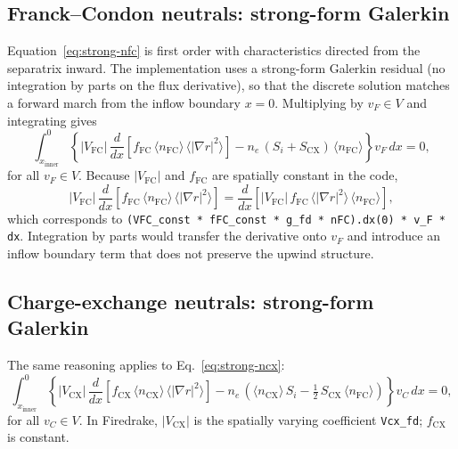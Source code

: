 \subsection{Franck--Condon neutrals: strong-form Galerkin}
\label{sec:nfc-weak}

Equation~\eqref{eq:strong-nfc} is first order with characteristics
directed from the separatrix inward.
The implementation uses a strong-form Galerkin residual (no integration by
parts on the flux derivative), so that the discrete solution matches a
forward march from the inflow boundary $x=0$.
Multiplying by $v_F \in V$ and integrating gives
\begin{equation}
  \int_{x_{\mathrm{inner}}}^{0}
    \left\{
      |V_{\mathrm{FC}}|\,\frac{d}{dx}\!\left[f_{\mathrm{FC}}\,\langle n_{\mathrm{FC}}\rangle\,\langle|\nabla r|^{2}\rangle\right]
      - n_e\,(S_i + S_{\mathrm{CX}})\,\langle n_{\mathrm{FC}}\rangle
    \right\} v_F \, dx = 0,
  \label{eq:weak-nfc}
\end{equation}
for all $v_F \in V$.
Because $|V_{\mathrm{FC}}|$ and $f_{\mathrm{FC}}$ are spatially constant in the code,
\begin{equation}
  |V_{\mathrm{FC}}|\,\frac{d}{dx}\!\left[f_{\mathrm{FC}}\,\langle n_{\mathrm{FC}}\rangle\,\langle|\nabla r|^{2}\rangle\right]
  = \frac{d}{dx}\!\left[|V_{\mathrm{FC}}|\,f_{\mathrm{FC}}\,\langle|\nabla r|^{2}\rangle\,\langle n_{\mathrm{FC}}\rangle\right],
\end{equation}
which corresponds to \texttt{(VFC\_const * fFC\_const * g\_fd * nFC).dx(0) * v\_F * dx}.
Integration by parts would transfer the derivative onto $v_F$ and introduce
an inflow boundary term that does not preserve the upwind structure.

\subsection{Charge-exchange neutrals: strong-form Galerkin}
\label{sec:ncx-weak}

The same reasoning applies to Eq.~\eqref{eq:strong-ncx}:
\begin{equation}
  \int_{x_{\mathrm{inner}}}^{0}
    \left\{
      |V_{\mathrm{CX}}|\,\frac{d}{dx}\!\left[f_{\mathrm{CX}}\,\langle n_{\mathrm{CX}}\rangle\,\langle|\nabla r|^{2}\rangle\right]
      - n_e\,\left(\langle n_{\mathrm{CX}}\rangle\,S_i - \tfrac{1}{2}\,S_{\mathrm{CX}}\,\langle n_{\mathrm{FC}}\rangle\right)
    \right\} v_C \, dx = 0,
  \label{eq:weak-ncx}
\end{equation}
for all $v_C \in V$.
In Firedrake, $|V_{\mathrm{CX}}|$ is the spatially varying coefficient
\texttt{Vcx\_fd}; $f_{\mathrm{CX}}$ is constant.

